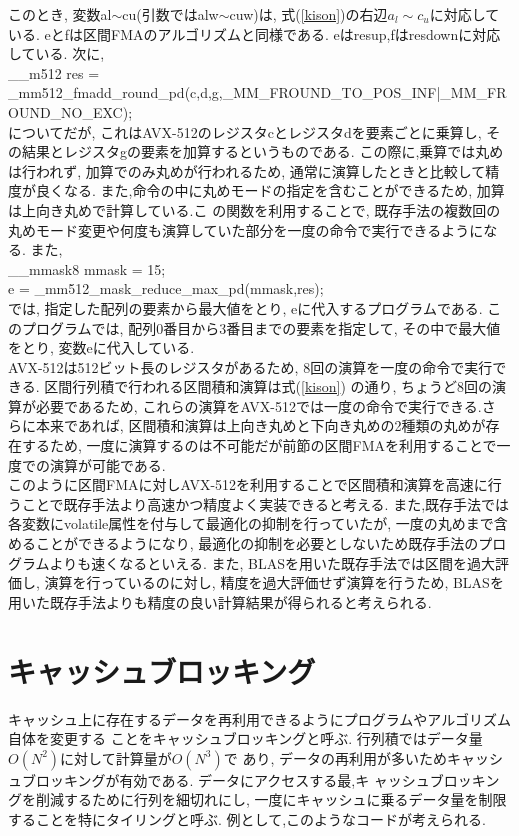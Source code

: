 \documentclass[11pt,a4paper]{jsreport}
\theoremstyle{definition}
\begin{document}
このとき, 変数al$\sim$cu(引数ではalw$\sim$cuw)は, 式(\ref{kison})の右辺$a_l \sim c_u$に対応している. eとfは区間FMAのアルゴリズムと同様である. eはresup,fはresdownに対応している. 次に, \\
\_\_m512 res = \_mm512\_fmadd\_round\_pd(c,d,g,\_MM\_FROUND\_TO\_POS\_INF|\_MM\_FROUND\_NO\_EXC); \\
についてだが, これはAVX-512のレジスタcとレジスタdを要素ごとに乗算し, その結果とレジスタgの要素を加算するというものである. この際に,乗算では丸めは行われず, 加算でのみ丸めが行われるため, 通常に演算したときと比較して精度が良くなる. また,命令の中に丸めモードの指定を含むことができるため, 加算は上向き丸めで計算している.こ の関数を利用することで, 既存手法の複数回の丸めモード変更や何度も演算していた部分を一度の命令で実行できるようになる. また, \\
\_\_mmask8 mmask = 15; \\
e = \_mm512\_mask\_reduce\_max\_pd(mmask,res); \\
では, 指定した配列の要素から最大値をとり, eに代入するプログラムである. このプログラムでは, 配列0番目から3番目までの要素を指定して, その中で最大値をとり, 変数eに代入している. \\
\indent AVX-512は512ビット長のレジスタがあるため, 8回の演算を一度の命令で実行できる. 区間行列積で行われる区間積和演算は式(\ref{kison}) の通り, ちょうど8回の演算が必要であるため, これらの演算をAVX-512では一度の命令で実行できる.さ らに本来であれば, 区間積和演算は上向き丸めと下向き丸めの2種類の丸めが存在するため, 一度に演算するのは不可能だが前節の区間FMAを利用することで一度での演算が可能である. \\
\indent このように区間FMAに対しAVX-512を利用することで区間積和演算を高速に行うことで既存手法より高速かつ精度よく実装できると考える. また,既存手法では各変数にvolatile属性を付与して最適化の抑制を行っていたが, 一度の丸めまで含めることができるようになり, 最適化の抑制を必要としないため既存手法のプログラムよりも速くなるといえる. また, BLASを用いた既存手法では区間を過大評価し, 演算を行っているのに対し, 精度を過大評価せず演算を行うため, BLASを用いた既存手法よりも精度の良い計算結果が得られると考えられる.
\section{キャッシュブロッキング}
  キャッシュ上に存在するデータを再利用できるようにプログラムやアルゴリズム自体を変更する
ことをキャッシュブロッキングと呼ぶ. 行列積ではデータ量$O(N^2)$に対して計算量が$O(N^3)$で
あり, データの再利用が多いためキャッシュブロッキングが有効である. データにアクセスする最,キ
ャッシュブロッキングを削減するために行列を細切れにし, 一度にキャッシュに乗るデータ量を制限することを特にタイリングと呼ぶ. 例として,このようなコードが考えられる.
\end{document}
